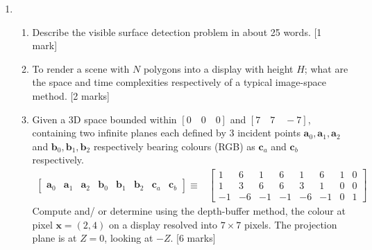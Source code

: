 \documentclass[11pt]{qptiet}
\begin{document}
\begin{enumerate}[resume]
\item \begin{enumerate}
\item Describe the visible surface detection problem in
about 25 words. \hfill [1 mark]
\item To render a scene with \(N\) polygons into a
display with height \(H\); what are the space and
time complexities respectively of a typical
image-space method. \hfill [2 marks]
\item Given a 3D space bounded within \([0\quad0\quad0]\)
and \([7\quad7\quad-7]\), containing two infinite
planes each defined by 3 incident points
\(\mathbf{a}_0, \mathbf{a}_1, \mathbf{a}_2\) and
\(\mathbf{b}_0, \mathbf{b}_1, \mathbf{b}_2\)
respectively bearing colours (RGB) as
\(\mathbf{c}_a\) and \(\textbf{c}_b\) respectively.
\begin{align*}
  \begin{bmatrix}
    \mathbf{a}_0&\mathbf{a}_1&\mathbf{a}_2
    &\mathbf{b}_0&\mathbf{b}_1&\mathbf{b}_2
    &\mathbf{c}_a&\mathbf{c}_b
  \end{bmatrix}\equiv
  &\begin{bmatrix}
    1&6&1&6&1&6&1&0 \\
    1&3&6&6&3&1&0&0 \\
    -1&-6&-1&-1&-6&-1&0&1
  \end{bmatrix}
\end{align*}
Compute and/ or determine using the depth-buffer
method, the colour at pixel \(\mathbf{x}=(2,4)\) on
a display resolved into \(7\times7\) pixels. The
projection plane is at \(Z=0\), looking at
\(-Z\). \hfill [6 marks]
\end{enumerate}
\end{enumerate}

\bvrhrule
\end{document}
